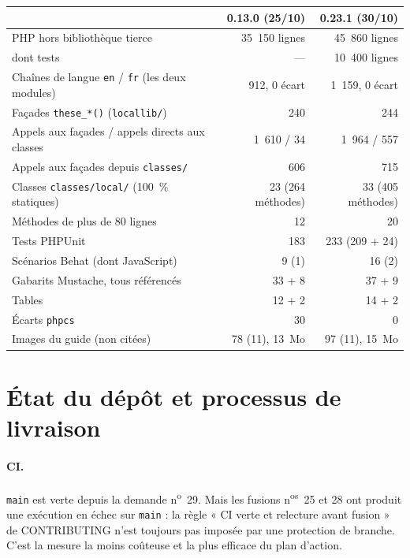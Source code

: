 \documentclass[11pt,a4paper]{article}
\newcommand{\fichier}[1]{\texttt{\small #1}}
\newcommand{\code}[1]{\texttt{#1}}
\begin{document}
\begin{center}
\begin{tabular}{lrr}
\toprule
 & \textbf{0.13.0 (25/10)} & \textbf{0.23.1 (30/10)} \\
\midrule
PHP hors bibliothèque tierce & 35~150 lignes & 45~860 lignes \\
dont tests & --- & 10~400 lignes \\
Chaînes de langue \code{en} / \code{fr} (les deux modules) & 912, 0 écart & 1~159, 0 écart \\
Façades \code{these\_*()} (\fichier{locallib/}) & 240 & 244 \\
Appels aux façades / appels directs aux classes & 1~610 / 34 & 1~964 / 557 \\
Appels aux façades depuis \fichier{classes/} & 606 & 715 \\
Classes \fichier{classes/local/} (100~\% statiques) & 23 (264 méthodes) & 33 (405 méthodes) \\
Méthodes de plus de 80 lignes & 12 & 20 \\
Tests PHPUnit & 183 & 233 (209 + 24) \\
Scénarios Behat (dont JavaScript) & 9 (1) & 16 (2) \\
Gabarits Mustache, tous référencés & 33 + 8 & 37 + 9 \\
Tables & 12 + 2 & 14 + 2 \\
Écarts \code{phpcs} & 30 & 0 \\
Images du guide (non citées) & 78 (11), 13~Mo & 97 (11), 15~Mo \\
\bottomrule
\end{tabular}
\end{center}

\section{État du dépôt et processus de livraison}\label{sec:processus}

\paragraph{CI.}
\code{main} est verte depuis la demande n\textsuperscript{o}~29. Mais les fusions
n\textsuperscript{os}~25 et 28 ont produit une exécution en échec sur \code{main} : la règle
« CI verte et relecture avant fusion » de CONTRIBUTING n'est toujours pas imposée par une
protection de branche. C'est la mesure la moins coûteuse et la plus efficace du plan d'action.
\end{document}
